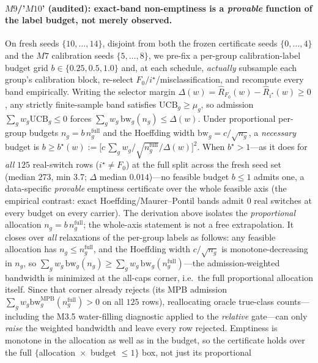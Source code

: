 \documentclass{article}
\begin{document}
\paragraph{$M9$/'$M10$' (audited): exact-band non-emptiness is a \emph{provable} function of the
label budget, not merely observed.}
On fresh seeds $\{10,\dots,14\}$, disjoint from both the frozen certificate seeds
$\{0,\dots,4\}$ and the $M7$ calibration seeds $\{5,\dots,8\}$, we pre-fix a per-group
calibration-label budget grid $b\!\in\!\{0.25,0.5,1.0\}$ and, at each schedule, \emph{actually}
subsample each group's calibration block, re-select $F_0/i^\star$/misclassification, and recompute
every band empirically. Writing the selector margin $\Delta(w)\!=\!\hat R_{F_0}(w)\!-\!\hat
R_{i^\star}(w)\ge0$, any strictly finite-sample band satisfies $\mathrm{UCB}_g\ge\mu_g$, so
admission $\sum_g w_g\mathrm{UCB}_g\le0$ forces $\sum_g w_g\,\mathrm{bw}_g(n_g)\le\Delta(w)$.
Under proportional per-group budgets $n_g=b\,n_g^{\mathrm{full}}$ and the Hoeffding width
$\mathrm{bw}_g=c/\sqrt{n_g}$, a \emph{necessary} budget is
$b\ge b^\star(w)\!:=\!\big[c\,\sum_g w_g/\sqrt{n_g^{\mathrm{full}}}/\Delta(w)\big]^2$. When
$b^\star>1$---as it does for \emph{all} $125$ real-switch rows ($i^\star\!\ne\!F_0$) at the full
split across the fresh seed set (median $273$, min $3.7$; $\Delta$ median $0.014$)---no feasible
budget $b\le1$ admits one, a data-specific \emph{provable} emptiness certificate over the whole
feasible axis (the empirical contrast: exact Hoeffding/Maurer--Pontil bands admit $0$ real
switches at every budget on every carrier). The derivation above isolates the \emph{proportional}
allocation $n_g=b\,n_g^{\mathrm{full}}$; the whole-axis statement is not a free extrapolation.
It closes over \emph{all} relaxations of the per-group labels as follows: any feasible allocation
has $n_g\le n_g^{\mathrm{full}}$, and the Hoeffding width $c/\sqrt{n_g}$ is monotone-decreasing in
$n_g$, so $\sum_g w_g\,\mathrm{bw}_g(n_g)\ge\sum_g w_g\,\mathrm{bw}_g(n_g^{\mathrm{full}})$---the
admission-weighted bandwidth is minimized at the all-caps corner, i.e.\ the full proportional
allocation itself. Since that corner already rejects (its MPB admission
$\sum_g w_g\mathrm{bw}^{\mathrm{MPB}}_g(n_g^{\mathrm{full}})>0$ on all $125$ rows), reallocating
oracle true-class counts---including the M3.5 water-filling diagnostic applied to the
\emph{relative} gate---can only \emph{raise} the weighted bandwidth and leave every row
rejected. Emptiness is monotone in the allocation as well as in the budget, so the certificate
holds over the full $\{$allocation ${}\times{}$ budget $\le1\}$ box, not just its proportional
\end{document}
